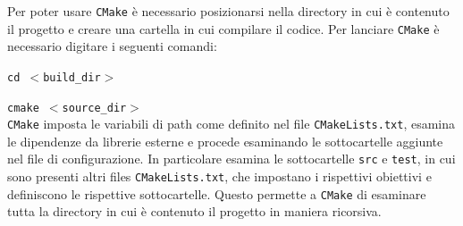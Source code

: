 
Per poter usare \texttt{CMake} è necessario posizionarsi nella directory in cui è contenuto il progetto e creare una cartella in cui compilare il codice. Per lanciare \texttt{CMake} è necessario digitare i seguenti comandi: \\ 

\par  \texttt{cd $<$build\_dir$>$ } 
\par \texttt{cmake $<$source\_dir$>$}\\

\noindent \texttt{CMake} imposta le variabili di path come definito nel file  \texttt{CMakeLists.txt}, esamina le dipendenze da librerie esterne e procede esaminando le sottocartelle aggiunte nel file di configurazione. In particolare esamina le sottocartelle \texttt{src} e \texttt{test}, in cui sono presenti altri files  \texttt{CMakeLists.txt}, che impostano i rispettivi obiettivi e definiscono le rispettive sottocartelle. Questo permette a \texttt{CMake} di esaminare tutta la directory in cui è contenuto il progetto in maniera ricorsiva. \\

